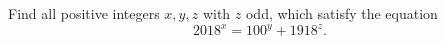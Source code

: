 Find all positive integers $x,y,z$ with $z$ odd, which satisfy the equation
$$2018^x=100^y + 1918^z.$$

